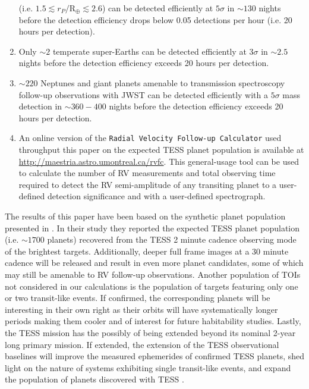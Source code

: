 \begin{enumerate}
  (i.e. $1.5 \lesssim r_P/\text{R}_{\oplus} \lesssim 2.6$) can be detected efficiently at $5\sigma$
  in $\sim 130$ nights before the detection efficiency drops below 0.05 detections per hour
  (i.e. 20 hours per detection).
\item Only $\sim 2$ temperate super-Earths can be detected efficiently at $3\sigma$ in $\sim 2.5$ nights
  before the detection efficiency exceeds 20 hours per detection.
\item $\sim 220$ Neptunes and giant planets
  amenable to transmission spectroscopy follow-up observations with
  JWST can be detected efficiently with a $5\sigma$ mass detection in $\sim 360-400$ nights before
  the detection efficiency exceeds 20 hours per detection.
\item An online version of the \texttt{Radial Velocity Follow-up Calculator} used throughput this paper on the
  expected TESS planet population is available at
  \url{http://maestria.astro.umontreal.ca/rvfc}. This general-usage tool can be used to calculate the
  number of RV measurements and total observing time required to detect the RV semi-amplitude of any
  transiting planet to a user-defined detection significance and with a user-defined spectrograph.
\end{enumerate}

The results of this paper have been based on the synthetic planet population presented in
. In their study they reported the expected TESS planet population (i.e.
$\sim 1700$ planets) recovered from the TESS 2 minute cadence observing mode of the brightest targets.
Additionally, deeper full frame images at a 30 minute cadence will be released and result in even more planet
candidates, some of which may still be amenable to RV follow-up observations. Another population of TOIs
not considered in our calculations is the population of targets featuring only one or two transit-like events.
If confirmed, the corresponding planets will be interesting in their own right as their orbits will
have systematically longer periods making them cooler and of interest for future habitability studies. 
Lastly, the TESS mission has the possibly of being extended beyond its nominal 2-year long primary mission.
If extended, the extension of the TESS observational baselines will improve the measured ephemerides of confirmed TESS
planets, shed light on the nature of systems exhibiting single transit-like events, and expand the
population of planets discovered with TESS \cite[see the overview in][]{bouma17}.

